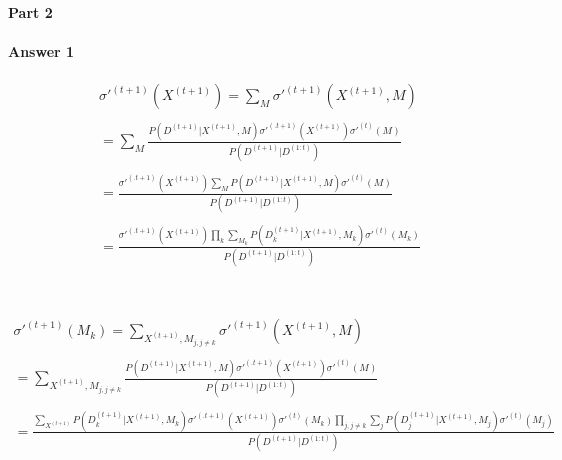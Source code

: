 \documentclass[12pt]{article}
\begin{document}
\newpage
\begin{center}
\paragraph{Part 2}
\end{center}

\paragraph{Answer 1}  

\[\begin{array}{l}
 \sigma {'^{(t + 1)}}({X^{(t + 1)}}) = \sum\nolimits_M {\sigma {'^{(t + 1)}}({X^{(t + 1)}},M)}  \\ \\
  = \sum\limits_M {\frac{{P({D^{(t + 1)}}|{X^{(t + 1)}},M)\sigma {'^{(.t + 1)}}({X^{(t + 1)}})\sigma {'^{(t)}}(M)}}{{P({D^{(t + 1)}}|{D^{(1:t)}})}}}  \\ \\
  = \frac{{\sigma {'^{(.t + 1)}}({X^{(t + 1)}})\sum\limits_M {P({D^{(t + 1)}}|{X^{(t + 1)}},M)\sigma {'^{(t)}}(M)} }}{{P({D^{(t + 1)}}|{D^{(1:t)}})}} \\ \\
  = \frac{{\sigma {'^{(.t + 1)}}({X^{(t + 1)}})\prod\limits_k {\sum\limits_{{M_k}} {P({D^{(t + 1)}_{k}}|{X^{(t + 1)}},{M_k})\sigma {'^{(t)}}({M_k})} } }}{{P({D^{(t + 1)}}|{D^{(1:t)}})}} \\ 
 \end{array}\]
 \\
 \\
 
 \[\begin{array}{l}
 \sigma {'^{(t + 1)}}({M_k}) = \sum\nolimits_{{X^{(t + 1)}},{M_{j,j \ne k}}} {\sigma {'^{(t + 1)}}({X^{(t + 1)}},M)}  \\ \\
  = \sum\limits_{{X^{(t + 1)}},{M_{j,j \ne k}}} {\frac{{P({D^{(t + 1)}}|{X^{(t + 1)}},M)\sigma {'^{(.t + 1)}}({X^{(t + 1)}})\sigma {'^{(t)}}(M)}}{{P({D^{(t + 1)}}|{D^{(1:t)}})}}}  \\ \\
  = \frac{{\sum\limits_{{X^{(t + 1)}}} {P({D^{(t + 1)}_{k}}|{X^{(t + 1)}},{M_k})\sigma {'^{(.t + 1)}}({X^{(t + 1)}})} \sigma {'^{(t)}}({M_k})\prod\limits_{j,j \ne k} {\sum\limits_j {P({D^{(t + 1)}_{j}}|{X^{(t + 1)}},{M_j})\sigma {'^{(t)}}({M_j})} } }}{{P({D^{(t + 1)}}|{D^{(1:t)}})}} \\ \\
 \end{array}\]
\end{document}
